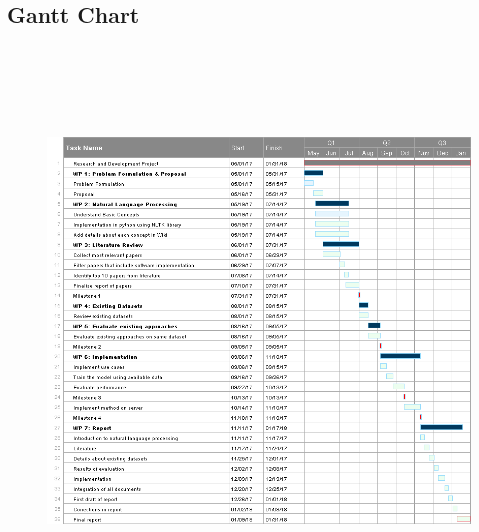 \documentclass{article}
\begin{document}
\subsection{Gantt Chart}
\centering
\begin{figure}[h]
\includegraphics[width=15cm,height=15cm]{workplan.png}
\end{figure}
\newpage
\end{document}
